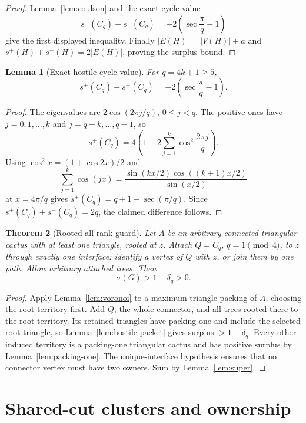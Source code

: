 \documentclass[11pt]{article}
\newtheorem{theorem}{Theorem}[section]
\newtheorem{lemma}[theorem]{Lemma}
\theoremstyle{remark}
\newcommand{\splus}{s^+}
\newcommand{\sminus}{s^-}
\newcommand{\sig}{\sigma}
\begin{document}
\begin{proof}
Lemma~\ref{lem:coulson} and the exact cycle value
\[
 \splus(C_q)-\sminus(C_q)=-2\left(\sec\frac\pi q-1\right)
\]
give the first displayed inequality.  Finally
$|E(H)|=|V(H)|+a$ and
$\splus(H)+\sminus(H)=2|E(H)|$, proving the surplus bound.
\end{proof}

\begin{lemma}[Exact hostile-cycle value]\label{lem:qvalue}
For $q=4k+1\geq5$,
\[
 \splus(C_q)-\sminus(C_q)
 =-2\left(\sec\frac\pi q-1\right).
\]
\end{lemma}

\begin{proof}
The eigenvalues are $2\cos(2\pi j/q)$, $0\leq j<q$.  The positive ones have
$j=0,1,\ldots,k$ and $j=q-k,\ldots,q-1$, so
\[
 \splus(C_q)=4\left(1+2\sum_{j=1}^k
                   \cos^2\frac{2\pi j}{q}\right).
\]
Using $\cos^2x=(1+\cos2x)/2$ and
\[
 \sum_{j=1}^k\cos(jx)
 =\frac{\sin(kx/2)\cos((k+1)x/2)}{\sin(x/2)}
\]
at $x=4\pi/q$ gives
$\splus(C_q)=q+1-\sec(\pi/q)$.  Since
$\splus(C_q)+\sminus(C_q)=2q$, the claimed difference follows.
\end{proof}

\begin{theorem}[Rooted all-rank guard]\label{thm:rooted}
Let $A$ be an arbitrary connected triangular cactus with at least one triangle,
rooted at $z$.  Attach $Q=C_q$, $q=1\pmod4$, to $z$ through exactly one
interface: identify a vertex of $Q$ with $z$, or join them by one path.
Allow arbitrary attached trees.  Then
\[
 \sig(G)>1-\delta_q>0.
\]
\end{theorem}

\begin{proof}
Apply Lemma~\ref{lem:voronoi} to a maximum triangle packing of $A$, choosing
the root territory first.  Add $Q$, the whole connector, and all trees rooted
there to the root territory.  Its retained triangles have packing one and
include the selected root triangle, so Lemma~\ref{lem:hostile-packet} gives
surplus $>1-\delta_q$.  Every other induced territory is a packing-one
triangular cactus and has positive surplus by Lemma~\ref{lem:packing-one}.
The unique-interface hypothesis ensures that no connector vertex must have two
owners.  Sum by Lemma~\ref{lem:super}.
\end{proof}

\section{Shared-cut clusters and ownership}
\end{document}
